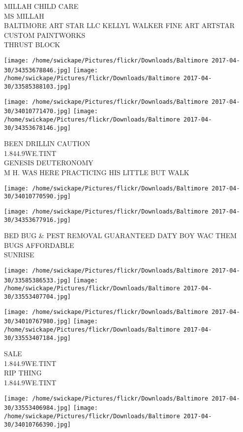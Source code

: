 \documentclass[10pt,letterpaper]{article}
\begin{document}
MILLAH CHILD CARE\\
MS MILLAH\\
BALTIMORE ART STAR LLC KELLYL WALKER FINE ART ARTSTAR CUSTOM PAINTWORKS\\
THRUST BLOCK\\
\pagebreak

\texttt{[image: /home/swickape/Pictures/flickr/Downloads/Baltimore 2017-04-30/34353678846.jpg]}
\texttt{[image: /home/swickape/Pictures/flickr/Downloads/Baltimore 2017-04-30/33585388103.jpg]}

\texttt{[image: /home/swickape/Pictures/flickr/Downloads/Baltimore 2017-04-30/34010771470.jpg]}
\texttt{[image: /home/swickape/Pictures/flickr/Downloads/Baltimore 2017-04-30/34353678146.jpg]}

BEEN DRILLIN CAUTION\\
1.844.9WE.TINT\\
GENESIS DEUTERONOMY\\
M H. WAS HERE PRACTICING HIS LITTLE BUT WALK\\
\pagebreak

\texttt{[image: /home/swickape/Pictures/flickr/Downloads/Baltimore 2017-04-30/34010770590.jpg]}

\vspace{0.25in}
\texttt{[image: /home/swickape/Pictures/flickr/Downloads/Baltimore 2017-04-30/34353677916.jpg]}

BED BUG \& PEST REMOVAL GUARANTEED DATY BOY WAC THEM BUGS AFFORDABLE\\
SUNRISE\\
\pagebreak

\texttt{[image: /home/swickape/Pictures/flickr/Downloads/Baltimore 2017-04-30/33585386533.jpg]}
\texttt{[image: /home/swickape/Pictures/flickr/Downloads/Baltimore 2017-04-30/33553407704.jpg]}

\texttt{[image: /home/swickape/Pictures/flickr/Downloads/Baltimore 2017-04-30/34010767980.jpg]}
\texttt{[image: /home/swickape/Pictures/flickr/Downloads/Baltimore 2017-04-30/33553407184.jpg]}

SALE\\
1.844.9WE.TINT\\
RIP THING\\
1.844.9WE.TINT\\
\pagebreak

\texttt{[image: /home/swickape/Pictures/flickr/Downloads/Baltimore 2017-04-30/33553406984.jpg]}
\texttt{[image: /home/swickape/Pictures/flickr/Downloads/Baltimore 2017-04-30/34010766390.jpg]}
\end{document}
